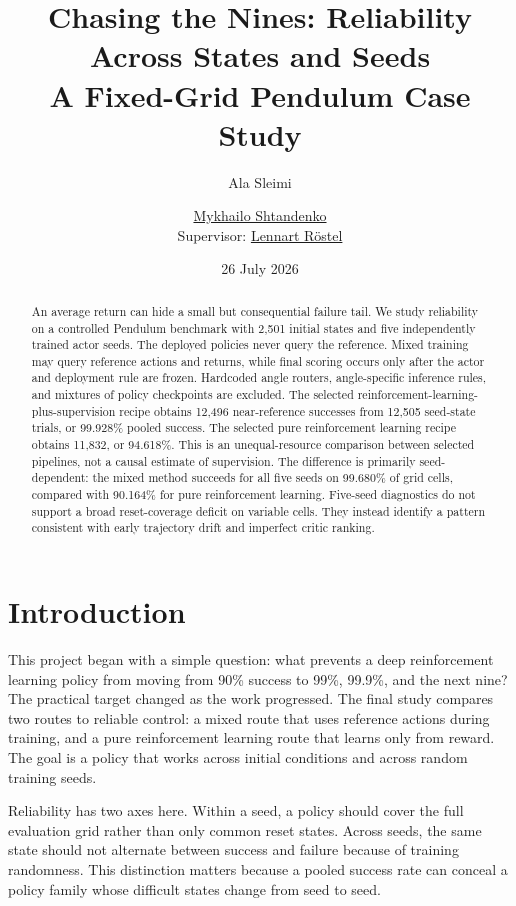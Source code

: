 \documentclass[10pt,twocolumn]{article}
\title{\vspace{-1.2em}\textbf{Chasing the Nines: Reliability Across States and Seeds}\\[-1mm]\large A Fixed-Grid Pendulum Case Study}
\author{Ala Sleimi \and \href{https://www.moodle.tum.de/user/view.php?id=261287\&course=117206}{Mykhailo Shtandenko}\\
\small Supervisor: \href{https://www.moodle.tum.de/user/view.php?id=140042\&course=117206}{Lennart Röstel}}
\date{26 July 2026}
\begin{document}

\clearpage
\iffalse
\maketitle
\vspace{-1.6em}

\begin{abstract}
An average return can hide a small but consequential failure tail. We study reliability on a controlled Pendulum benchmark with 2,501 initial states and five independently trained actor seeds. The deployed policies never query the reference. Mixed training may query reference actions and returns, while final scoring occurs only after the actor and deployment rule are frozen. Hardcoded angle routers, angle-specific inference rules, and mixtures of policy checkpoints are excluded. The selected reinforcement-learning-plus-supervision recipe obtains 12,496 near-reference successes from 12,505 seed-state trials, or 99.928\% pooled success. The selected pure reinforcement learning recipe obtains 11,832, or 94.618\%. This is an unequal-resource comparison between selected pipelines, not a causal estimate of supervision. The difference is primarily seed-dependent: the mixed method succeeds for all five seeds on 99.680\% of grid cells, compared with 90.164\% for pure reinforcement learning. Five-seed diagnostics do not support a broad reset-coverage deficit on variable cells. They instead identify a pattern consistent with early trajectory drift and imperfect critic ranking.
\end{abstract}

\section{Introduction}

This project began with a simple question: what prevents a deep reinforcement learning policy from moving from 90\% success to 99\%, 99.9\%, and the next nine? The practical target changed as the work progressed. The final study compares two routes to reliable control: a mixed route that uses reference actions during training, and a pure reinforcement learning route that learns only from reward. The goal is a policy that works across initial conditions and across random training seeds.

Reliability has two axes here. Within a seed, a policy should cover the full evaluation grid rather than only common reset states. Across seeds, the same state should not alternate between success and failure because of training randomness. This distinction matters because a pooled success rate can conceal a policy family whose difficult states change from seed to seed.
\end{document}
